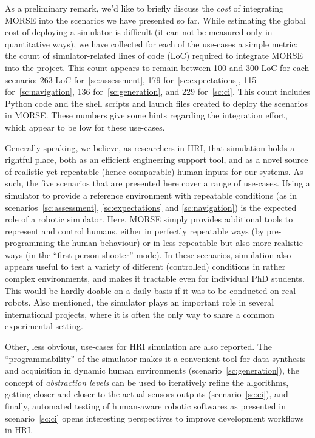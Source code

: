 \documentclass[conference]{IEEEtran}
\begin{document}
As a preliminary remark, we'd like to briefly discuss the \emph{cost} of
integrating MORSE into the scenarios we have presented so far. While estimating
the global cost of deploying a simulator is difficult (it can not be measured
only in quantitative ways), we have collected for each of the use-cases a simple
metric: the count of simulator-related lines of code ({\sc LoC}) required to
integrate MORSE into the project. This count appears to remain between 100 and
300 {\sc LoC} for each scenario: 263 {\sc LoC} for~\ref{sc:assessment}, 179
for~\ref{sc:expectations}, 115 for~\ref{sc:navigation}, 136
for~\ref{sc:generation}, and 229 for~\ref{sc:ci}.  This count includes Python
code and the shell scripts and launch files created to deploy the scenarios in
MORSE. These numbers give some hints regarding the integration effort, which
appear to be low for these use-cases.

Generally speaking, we believe, as researchers in HRI,  that simulation holds a
rightful place, both as an efficient engineering support tool, and as a novel
source of realistic yet repeatable (hence comparable) human inputs for our
systems. As such, the five scenarios that are presented here cover a range of
use-cases.  Using a simulator to provide a reference environment with repeatable
conditions (as in scenarios~\ref{sc:assessment}, \ref{sc:expectations} and
\ref{sc:navigation}) is the expected role of a robotic simulator. Here, MORSE
simply provides additional tools to represent and control humans, either in
perfectly repeatable ways (by pre-programming the human behaviour) or in less
repeatable but also more realistic ways (in the ``first-person shooter'' mode).
In these scenarios, simulation also appears useful to test a variety of
different (controlled) conditions in rather complex environments, and makes it
tractable even for individual PhD students. This would be hardly doable on a
daily basis if it was to be conducted on real robots.  Also mentioned, the
simulator plays an important role in several international projects, where it is
often the only way to share a common experimental setting.

Other, less obvious, use-cases for HRI simulation are also reported. The
``programmability'' of the simulator makes it a convenient tool for data
synthesis and acquisition in dynamic human environments
(scenario~\ref{sc:generation}), the concept of \emph{abstraction levels} can be
used to iteratively refine the algorithms, getting closer and closer to the
actual sensors outputs (scenario~\ref{sc:ci}), and finally, automated testing of
human-aware robotic softwares as presented in scenario~\ref{sc:ci} opens
interesting perspectives to improve development workflows in HRI.
\end{document}
